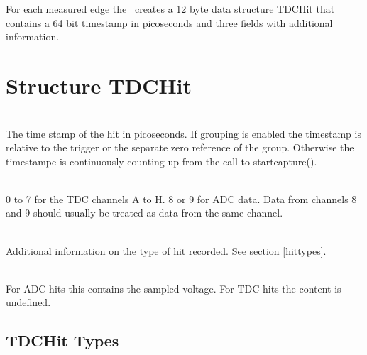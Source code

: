 For each measured edge the \deviceName\ creates a 12 byte data structure TDCHit that contains a 64 bit timestamp in picoseconds and three fields with additional information. 

\section{Structure TDCHit}
\label{TDCHit}
\\
The time stamp of the hit in picoseconds. If grouping is enabled the timestamp is relative to the trigger or the separate zero reference of the group. 
Otherwise the timestampe is continuously counting up from the call to \textsf{start\tu capture()}.

\\
0 to 7 for the TDC channels A to H. 8 or 9 for ADC data. Data from channels 8 and 9 should usually be treated as data from the same channel. 

\\
Additional information on the type of hit recorded. See section \ref{hittypes}.

\\
For ADC hits this contains the sampled voltage. For TDC hits the content is undefined.

\newpage
\subsection{TDCHit Types \label{hittypes}}
\newcommand{\HTYPE}{\PREFIX TDCHIT\tu TYPE\tu}

